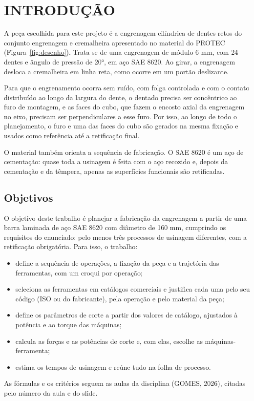 \chapter{INTRODUÇÃO}

A peça escolhida para este projeto é a engrenagem cilíndrica de dentes retos do conjunto engrenagem e cremalheira apresentado no material do PROTEC (Figura~\ref{fig:desenho}). Trata-se de uma engrenagem de módulo 6 mm, com 24 dentes e ângulo de pressão de 20°, em aço SAE 8620. Ao girar, a engrenagem desloca a cremalheira em linha reta, como ocorre em um portão deslizante.

Para que o engrenamento ocorra sem ruído, com folga controlada e com o contato distribuído ao longo da largura do dente, o dentado precisa ser concêntrico ao furo de montagem, e as faces do cubo, que fazem o encosto axial da engrenagem no eixo, precisam ser perpendiculares a esse furo. Por isso, ao longo de todo o planejamento, o furo e uma das faces do cubo são gerados na mesma fixação e usados como referência até a retificação final.

O material também orienta a sequência de fabricação. O SAE 8620 é um aço de cementação: quase toda a usinagem é feita com o aço recozido e, depois da cementação e da têmpera, apenas as superfícies funcionais são retificadas.

\section{Objetivos}

O objetivo deste trabalho é planejar a fabricação da engrenagem a partir de uma barra laminada de aço SAE 8620 com diâmetro de 160 mm, cumprindo os requisitos do enunciado: pelo menos três processos de usinagem diferentes, com a retificação obrigatória. Para isso, o trabalho:

\begin{itemize}
\item define a sequência de operações, a fixação da peça e a trajetória das ferramentas, com um croqui por operação;
\item seleciona as ferramentas em catálogos comerciais e justifica cada uma pelo seu código (ISO ou do fabricante), pela operação e pelo material da peça;
\item define os parâmetros de corte a partir dos valores de catálogo, ajustados à potência e ao torque das máquinas;
\item calcula as forças e as potências de corte e, com elas, escolhe as máquinas-ferramenta;
\item estima os tempos de usinagem e reúne tudo na folha de processo.
\end{itemize}

As fórmulas e os critérios seguem as aulas da disciplina (GOMES, 2026), citadas pelo número da aula e do slide.
